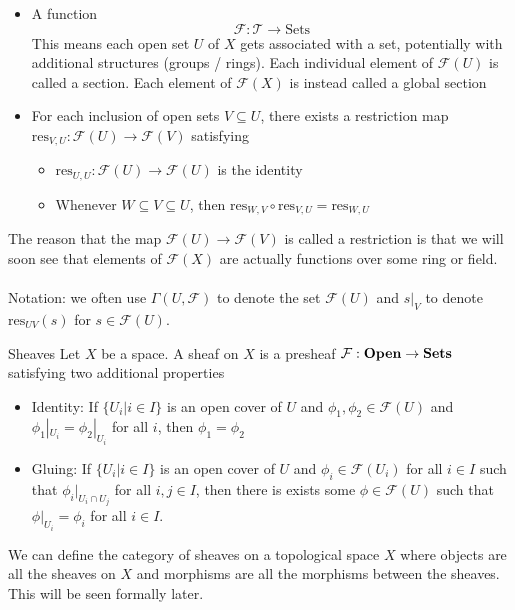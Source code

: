 \documentclass[a4paper]{article}
\begin{document}
\begin{itemize}
\item A function $$\mathcal{F}:\mathcal{T}\to\text{Sets}$$ This means each open set $U$ of $X$ gets associated with a set, potentially with additional structures (groups / rings). Each individual element of $\mathcal{F}(U)$ is called a section. Each element of $\mathcal{F}(X)$ is instead called a global section
\item For each inclusion of open sets $V\subseteq U$, there exists a restriction map $\text{res}_{V,U}:\mathcal{F}(U)\to\mathcal{F}(V)$
 satisfying
\begin{itemize}
\item $\text{res}_{U,U}:\mathcal{F}(U)\to\mathcal{F}(U)$ is the identity
\item Whenever $W\subseteq V\subseteq U$, then $\text{res}_{W,V}\circ\text{res}_{V,U}=\text{res}_{W,U}$
\end{itemize}
\end{itemize}

The reason that the map $\mathcal{F}(U)\to\mathcal{F}(V)$ is called a restriction is that we will soon see that elements of $\mathcal{F}(X)$ are actually functions over some ring or field. \\~\\
Notation: we often use $\Gamma(U,\mathcal{F})$ to denote the set $\mathcal{F}(U)$ and $s|_V$ to denote $\text{res}_{UV}(s)$ for $s\in\mathcal{F}(U)$. 

\begin{defn}{Sheaves}{} Let $X$ be a space. A sheaf on $X$ is a presheaf $\mathcal{F}:\bold{Open}\to\bold{Sets}$ satisfying two additional properties
\begin{itemize}
\item Identity: If $\{U_i|i\in I\}$ is an open cover of $U$ and $\phi_1,\phi_2\in\mathcal{F}(U)$ and $\phi_1|_{U_i}=\phi_2|_{U_i}$ for all $i$, then $\phi_1=\phi_2$
\item Gluing: If $\{U_i|i\in I\}$ is an open cover of $U$ and $\phi_i\in\mathcal{F}(U_i)$ for all $i\in I$ such that $\phi_i|_{U_i\cap U_j}$ for all $i,j\in I$, then there is exists some $\phi\in\mathcal{F}(U)$ such that $\phi|_{U_i}=\phi_i$ for all $i\in I$. 
\end{itemize}
\end{defn}

We can define the category of sheaves on a topological space $X$ where objects are all the sheaves on $X$ and morphisms are all the morphisms between the sheaves. This will be seen formally later. \\~\\
\end{document}
